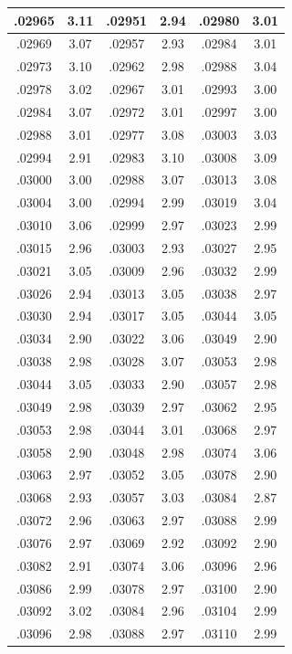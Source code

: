 \documentclass[11pt]{report}
\begin{document}
\begin{appendices}
\begin{longtable}{|c|c||c|c||c|c|}
.02965 & 3.11 & .02951 & 2.94 & .02980 & 3.01\\\hline
.02969 & 3.07 & .02957 & 2.93 & .02984 & 3.01\\\hline
.02973 & 3.10 & .02962 & 2.98 & .02988 & 3.04\\\hline
.02978 & 3.02 & .02967 & 3.01 & .02993 & 3.00\\\hline
.02984 & 3.07 & .02972 & 3.01 & .02997 & 3.00\\\hline
.02988 & 3.01 & .02977 & 3.08 & .03003 & 3.03\\\hline
.02994 & 2.91 & .02983 & 3.10 & .03008 & 3.09\\\hline
.03000 & 3.00 & .02988 & 3.07 & .03013 & 3.08\\\hline
.03004 & 3.00 & .02994 & 2.99 & .03019 & 3.04\\\hline
.03010 & 3.06 & .02999 & 2.97 & .03023 & 2.99\\\hline
.03015 & 2.96 & .03003 & 2.93 & .03027 & 2.95\\\hline
.03021 & 3.05 & .03009 & 2.96 & .03032 & 2.99\\\hline
.03026 & 2.94 & .03013 & 3.05 & .03038 & 2.97\\\hline
.03030 & 2.94 & .03017 & 3.05 & .03044 & 3.05\\\hline
.03034 & 2.90 & .03022 & 3.06 & .03049 & 2.90\\\hline
.03038 & 2.98 & .03028 & 3.07 & .03053 & 2.98\\\hline
.03044 & 3.05 & .03033 & 2.90 & .03057 & 2.98\\\hline
.03049 & 2.98 & .03039 & 2.97 & .03062 & 2.95\\\hline
.03053 & 2.98 & .03044 & 3.01 & .03068 & 2.97\\\hline
.03058 & 2.90 & .03048 & 2.98 & .03074 & 3.06\\\hline
.03063 & 2.97 & .03052 & 3.05 & .03078 & 2.90\\\hline
.03068 & 2.93 & .03057 & 3.03 & .03084 & 2.87\\\hline
.03072 & 2.96 & .03063 & 2.97 & .03088 & 2.99\\\hline
.03076 & 2.97 & .03069 & 2.92 & .03092 & 2.90\\\hline
.03082 & 2.91 & .03074 & 3.06 & .03096 & 2.96\\\hline
.03086 & 2.99 & .03078 & 2.97 & .03100 & 2.90\\\hline
.03092 & 3.02 & .03084 & 2.96 & .03104 & 2.99\\\hline
.03096 & 2.98 & .03088 & 2.97 & .03110 & 2.99\\\hline

\end{longtable}
\end{appendices}
\end{document}

